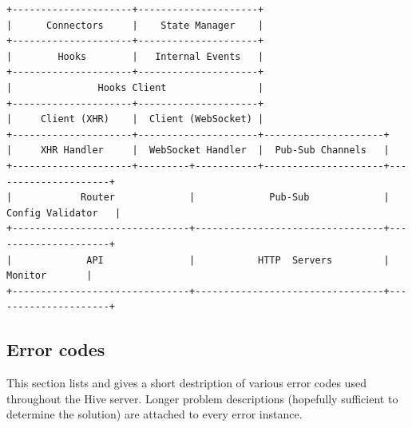 \documentclass[a4paper]{article}
\begin{document}
\begin{verbatim}
+---------------------+---------------------+
|      Connectors     |    State Manager    |
+---------------------+---------------------+
|        Hooks        |   Internal Events   |
+---------------------+---------------------+
|               Hooks Client                |
+---------------------+---------------------+
|     Client (XHR)    |  Client (WebSocket) |
+---------------------+---------------------+---------------------+
|     XHR Handler     |  WebSocket Handler  |  Pub-Sub Channels   |
+---------------------+---------+-----------+---------------------+---------------------+
|            Router             |             Pub-Sub             |  Config Validator   |
+-------------------------------+---------------------------------+---------------------+
|             API               |           HTTP  Servers         |       Monitor       |
+-------------------------------+---------------------------------+---------------------+
\end{verbatim}
\subsection{Error codes}
\label{sec-5-3}

This section lists and gives a short destription of various error codes used throughout the Hive server. Longer problem descriptions (hopefully sufficient to determine the solution) are attached to every error instance.
\end{document}
